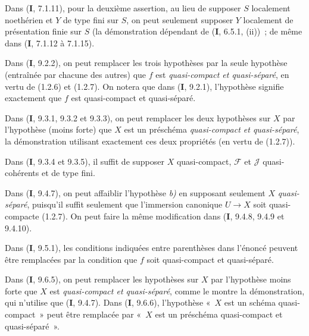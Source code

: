 \begin{env}[1.7.3]
\label{IV.1.7.3-fr}
Dans (\textbf{I}, 7.1.11), pour la deuxième assertion, au lieu de supposer $S$
localement noethérien et $Y$ de type fini sur $S$, on peut seulement supposer
$Y$ localement de présentation finie sur $S$ (la démonstration dépendant de
(\textbf{I}, 6.5.1, (ii))~; de même dans (\textbf{I}, 7.1.12 à 7.1.15).
\end{env}

\begin{env}[1.7.4]
Dans (\textbf{I}, 9.2.2), on peut remplacer les trois hypothèses par la seule hypothèse
(entraînée par chacune des autres) que $f$ est \emph{quasi-compact et
quasi-séparé}, en vertu de (1.2.6) et (1.2.7). On notera que dans (\textbf{I}, 9.2.1),
l'hypothèse signifie exactement que $f$ est quasi-compact et quasi-séparé.
\end{env}

\begin{env}[1.7.5]
\label{IV.1.7.5-fr}
Dans (\textbf{I}, 9.3.1, 9.3.2 et 9.3.3), on peut remplacer les deux hypothèses sur $X$
par l'hypothèse (moins forte) que $X$ est un préschéma \emph{quasi-compact et
quasi-séparé}, la démonstration utilisant exactement ces deux propriétés (en
vertu de (1.2.7)).
\end{env}

\begin{env}[1.7.6]
\label{IV.1.7.6-fr}
Dans (\textbf{I}, 9.3.4 et 9.3.5), il suffit de supposer $X$ quasi-compact,
$\mathcal F$ et $\mathcal J$ quasi-cohérents et de type fini.
\end{env}

\begin{env}[1.7.7]
\label{IV.1.7.7-fr}
Dans (\textbf{I}, 9.4.7), on peut affaiblir l'hypothèse \emph{b)} en supposant seulement $X$
\emph{quasi-séparé}, puisqu'il suffit seulement que l'immersion canonique
$U\to X$ soit quasi-compacte (1.2.7). On peut faire la même modification dans
(\textbf{I}, 9.4.8, 9.4.9 et 9.4.10).
\end{env}

\begin{env}[1.7.8]
\label{IV.1.7.8-fr}
Dans (\textbf{I}, 9.5.1), les conditions indiquées entre parenthèses dans l'énoncé
peuvent être remplacées par la condition que $f$ soit quasi-compact et
quasi-séparé.
\end{env}

\begin{env}[1.7.9]
\label{IV.1.7.9-fr}
Dans (\textbf{I}, 9.6.5), on peut remplacer les hypothèses sur $X$ par l'hypothèse
moins forte que $X$ est \emph{quasi-compact et quasi-séparé}, comme le montre la
démonstration,
qui n'utilise que (\textbf{I}, 9.4.7). Dans (\textbf{I}, 9.6.6), l'hypothèse «~$X$ est un
schéma quasi-compact~» peut être remplacée par «~$X$ est un préschéma
quasi-compact et quasi-séparé~».
\end{env}

